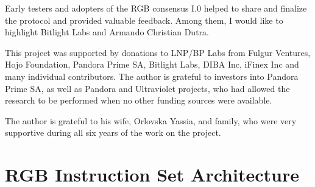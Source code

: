 \documentclass[9pt,oneside]{amsart}
\begin{document}
\begin{multicols}{2}
Early testers and adopters of the RGB consensus I.0 helped to share and finalize the protocol
and provided valuable feedback.
Among them, I would like to highlight Bitlight Labs and Armando Christian Dutra.

This project was supported by donations to LNP/BP Labs from Fulgur Ventures, Hojo Foundation,
Pandora Prime SA, Bitlight Labs, DIBA Inc, iFinex Inc and many individual contributors.
The author is grateful to investors into Pandora Prime SA,
as well as Pandora and Ultraviolet projects,
who had allowed the research to be performed when no other funding sources were available.

The author is grateful to his wife, Orlovska Yassia, and family,
who were very supportive during all six years of the work on the project.




\end{multicols}

\newpage

\appendix
\section{RGB Instruction Set Architecture}\label{AnnexA}
\end{document}
